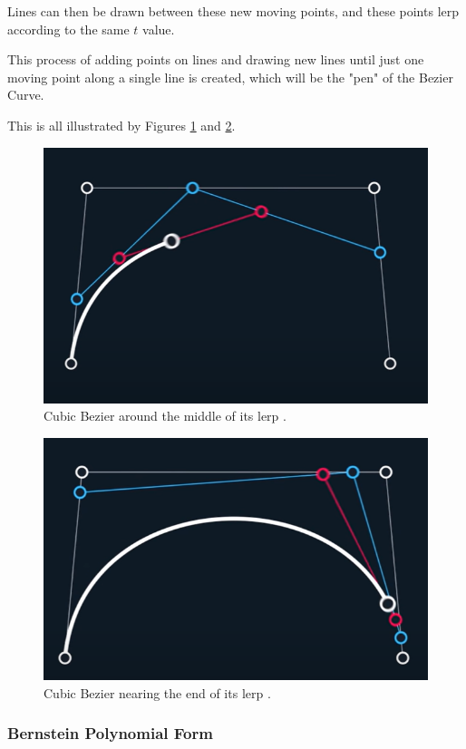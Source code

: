 \documentclass[letterpaper, 12pt]{article}
\begin{document}
Lines can then be drawn between these new moving points, and
these points lerp according to the same \(t\) value.

This process of adding points on lines and drawing new lines
until just one moving point along a single line is created, which
will be the "pen" of the Bezier Curve.

This is all illustrated by Figures \ref*{fig:cubic_ill_mid} and \ref*{fig:cubic_ill_end}.

\begin{figure}[H]
    \centering
    \includegraphics[width=.8\textwidth]{cubic_ill_mid.png}
    \caption{Cubic Bezier around the middle of its lerp \protect\cite{holmerBeautyBezierCurves2021}.}
    \label{fig:cubic_ill_mid}
\end{figure}

\begin{figure}[H]
    \centering
    \includegraphics[width=.8\textwidth]{cubic_ill_end.png}
    \caption{Cubic Bezier nearing the end of its lerp \protect\cite{holmerBeautyBezierCurves2021}.}
    \label{fig:cubic_ill_end}
\end{figure}

\subsubsection{Bernstein Polynomial Form}
\end{document}

